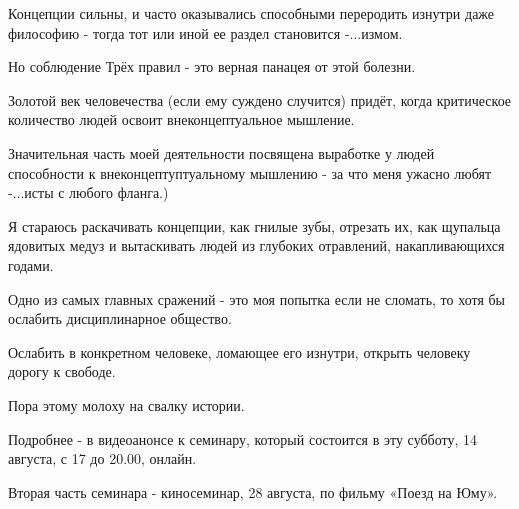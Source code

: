 Концепции сильны, и часто оказывались способными переродить изнутри даже
философию - тогда тот или иной ее раздел становится -...измом.

Но соблюдение Трёх правил - это верная панацея от этой болезни.

Золотой век человечества (если ему суждено случится) придёт, когда критическое
количество людей освоит внеконцептуальное мышление. 

Значительная часть моей деятельности посвящена выработке у людей способности к
внеконцептуптуальному мышлению - за что меня ужасно любят -...исты с любого
фланга.)

Я стараюсь раскачивать концепции, как гнилые зубы, отрезать их, как щупальца
ядовитых медуз и вытаскивать людей из глубоких отравлений, накапливающихся
годами.

Одно из самых главных сражений - это моя попытка если не сломать, то хотя бы
ослабить дисциплинарное общество.

Ослабить в конкретном человеке, ломающее его изнутри, открыть человеку дорогу к
свободе. 

Пора этому молоху на свалку истории. 

Подробнее - в видеоанонсе к семинару, который состоится в эту субботу, 14
августа, с 17 до 20.00, онлайн.

Вторая часть семинара - киносеминар, 28 августа, по фильму «Поезд на Юму».

